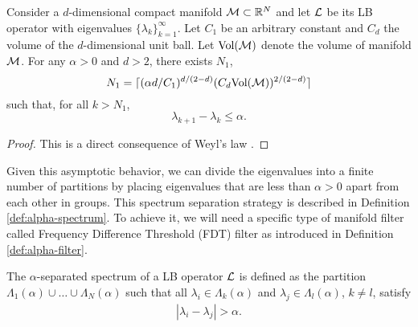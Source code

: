\begin{proposition} \label{prop:finite_num}
Consider a $d$-dimensional compact manifold ${\mathcal M}\subset {\mathbb R}^N$ and let ${\mathcal L}$ be its LB operator with eigenvalues $\{\lambda_k\}_{k=1}^\infty$. Let $C_1$ be an arbitrary constant and $C_d$ the volume of the $d$-dimensional unit ball. Let $\text{Vol}({\mathcal M})$ denote the volume of manifold ${\mathcal M}$. For any $\alpha > 0$ and $d>2$, there exists $N_1$,
\begin{equation}
    N_1=\lceil (\alpha d/C_1)^{d/(2-d)}(C_d \text{Vol}({\mathcal M}))^{2/(2-d)} \rceil
\end{equation}
such that, for all $k>N_1$, 
$$\lambda_{k+1}-\lambda_k\leq \alpha.$$
\end{proposition}
\begin{proof}
This is a direct consequence of Weyl's law \cite[Chapter~1]{arendt2009mathematical}.
\end{proof}

Given this asymptotic behavior, we can divide the eigenvalues into a finite number of partitions by placing eigenvalues that are less than $\alpha>0$ apart from each other in groups. This spectrum separation strategy is described in Definition \ref{def:alpha-spectrum}. To achieve it, we will need a specific type of manifold filter called Frequency Difference Threshold (FDT) filter as introduced in Definition \ref{def:alpha-filter}.



\begin{definition}\label{def:alpha-spectrum}
The $\alpha$-separated spectrum of a LB operator ${\mathcal L}$ is defined as the partition $\Lambda_1(\alpha) \cup \ldots\cup \Lambda_N(\alpha)$ such that all $\lambda_i \in \Lambda_k(\alpha)$ and $\lambda_j \in \Lambda_l(\alpha)$, $k \neq l$, satisfy
\begin{align}\label{eqn:alpha-spectrum}
|\lambda_i - \lambda_j| > \alpha \text{.}
\end{align}
\end{definition}


